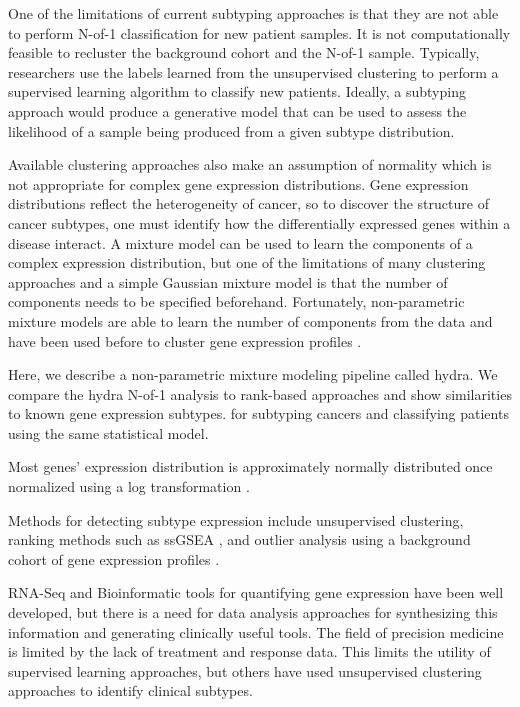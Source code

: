 \documentclass[fleqn,10pt]{wlscirep}
\begin{document}
One of the limitations of current subtyping approaches is that they are not able to perform N-of-1 classification for new patient samples. It is not computationally feasible to recluster the background cohort and the N-of-1 sample. Typically, researchers use the labels learned from the unsupervised clustering to perform a supervised learning algorithm to classify new patients. Ideally, a subtyping approach would produce a generative model that can be used to assess the likelihood of a sample being produced from a given subtype distribution.

Available clustering approaches also make an assumption of normality which is not appropriate for complex gene expression distributions. Gene expression distributions reflect the heterogeneity of cancer, so to discover the structure of cancer subtypes, one must identify how the differentially expressed genes within a disease interact. A mixture model can be used to learn the components of a complex expression distribution, but one of the limitations of many clustering approaches and a simple Gaussian mixture model is that the number of components needs to be specified beforehand. Fortunately, non-parametric mixture models are able to learn the number of components from the data and have been used before to cluster gene expression profiles \cite{medvedovic2002bayesian,newton2004detecting,zhao2014bayesian}.

Here, we describe a non-parametric mixture modeling pipeline called hydra. We compare the hydra N-of-1 analysis to rank-based approaches and show similarities to known gene expression subtypes. for subtyping cancers and classifying patients using the same statistical model.  

Most genes' expression distribution is approximately normally distributed once normalized using a log transformation \cite{zwiener2014transforming}. 

Methods for detecting subtype expression include unsupervised clustering, ranking methods such as ssGSEA \cite{barbie2009systematic}, and outlier analysis using a background cohort of gene expression profiles \cite{kothari2013outlier}. 

 


RNA-Seq and Bioinformatic tools for quantifying gene expression have been well developed, but there is a need for data analysis approaches for synthesizing this information and generating clinically useful tools. The field of precision medicine is limited by the 
lack of treatment and response data. This limits the utility of supervised learning 
approaches, but others have used unsupervised clustering approaches to identify clinical 
subtypes.
\end{document}
